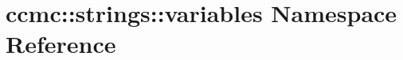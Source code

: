 \hypertarget{namespaceccmc_1_1strings_1_1variables}{\section{ccmc\-:\-:strings\-:\-:variables Namespace Reference}
\label{namespaceccmc_1_1strings_1_1variables}
}
